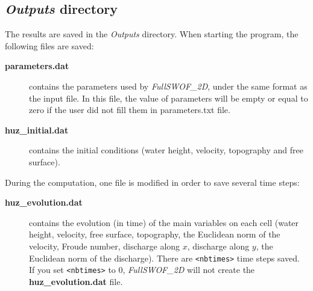 \documentclass[a4paper, 11pt]{article}
\newcommand{\FullSWOF}{\emph{FullSWOF\_2D}}
\begin{document}
\subsection{\emph{Outputs} directory}\label{sec:outputs}

The results are saved in the \textit{Outputs} directory. When starting the program, the following files are saved:
\begin{description}
	\item[\textbf{parameters.dat}] contains the parameters used by \FullSWOF, under the same format as the input file. In this file, the value of parameters will be empty or equal to zero if the user did not fill them in parameters.txt file. 
	\item[\textbf{huz\_initial.dat}] contains the initial conditions (water height, velocity, topography and free surface).
\end{description}
During the computation, one file is modified in order to save several time steps:
\begin{description}
	\item[\textbf{huz\_evolution.dat}] contains the evolution (in time) of the main variables on each cell (water height, velocity, free surface, topography, the Euclidean norm of the velocity, Froude number, discharge along $x$, discharge along $y$, the Euclidean norm of the discharge).
	There are \texttt{<nbtimes>} time steps saved.\\
	If you set \texttt{<nbtimes>} to 0, \FullSWOF{} will not create the \textbf{huz\_evolution.dat} file.
\end{description}
\end{document}
